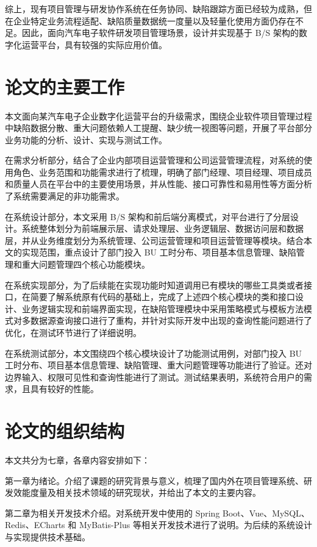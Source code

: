 综上，现有项目管理与研发协作系统在任务协同、缺陷跟踪方面已经较为成熟，但在企业特定业务流程适配、缺陷质量数据统一度量以及轻量化使用方面仍存在不足。因此，面向汽车电子软件研发项目管理场景，设计并实现基于 B/S 架构的数字化运营平台，具有较强的实际应用价值。

\section{论文的主要工作}

本文面向某汽车电子企业数字化运营平台的升级需求，围绕企业软件项目管理过程中缺陷数据分散、重大问题依赖人工提醒、缺少统一视图等问题，开展了平台部分业务功能的分析、设计、实现与测试工作。

在需求分析部分，结合了企业内部项目运营管理和公司运营管理流程，对系统的使用角色、业务范围和功能需求进行了梳理，明确了部门经理、项目经理、项目成员和质量人员在平台中的主要使用场景，并从性能、接口可靠性和易用性等方面分析了系统需要满足的非功能需求。

在系统设计部分，本文采用 B/S 架构和前后端分离模式，对平台进行了分层设计。系统整体划分为前端展示层、请求处理层、业务逻辑层、数据访问层和数据层，并从业务维度划分为系统管理、公司运营管理和项目运营管理等模块。结合本文的实现范围，重点设计了部门投入 BU 工时分布、项目基本信息管理、缺陷管理和重大问题管理四个核心功能模块。

在系统实现部分，为了后续能在实现功能时知道调用已有模块的哪些工具类或者接口，在简要了解系统原有代码的基础上，完成了上述四个核心模块的类和接口设计、业务逻辑实现和前端界面实现，在缺陷管理模块中采用策略模式与模板方法模式\cite{nazar2021designpatterndetection}对多数据源查询接口进行了重构，并针对实际开发中出现的查询性能问题进行了优化，在测试环节进行了详细说明。

在系统测试部分，本文围绕四个核心模块设计了功能测试用例，对部门投入 BU 工时分布、项目基本信息管理、缺陷管理、重大问题管理等功能进行了验证。还对边界输入、权限可见性和查询性能进行了测试。测试结果表明，系统符合用户的需求，且具有较好的性能。

\section{论文的组织结构}

本文共分为七章，各章内容安排如下：

第一章为绪论。介绍了课题的研究背景与意义，梳理了国内外在项目管理系统、研发效能度量及相关技术领域的研究现状，并给出了本文的主要内容。

第二章为相关开发技术介绍。对系统开发中使用的 Spring Boot、Vue、MySQL、Redis、ECharts 和 MyBatis-Plus 等相关开发技术进行了说明。为后续的系统设计与实现提供技术基础。

